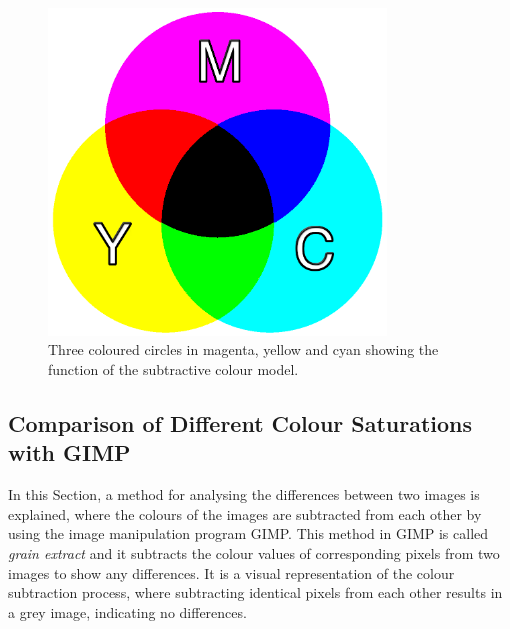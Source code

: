 \documentclass[../MasterThesis.tex]{subfiles}
\begin{document}
\begin{minipage}{0.48\textwidth}
\begin{figure}[H]
	\centering
	
	\includegraphics[width=0.8\textwidth]{YMCA.png}
	
	\caption[Subtractive colour model of RGB]{Three coloured circles in magenta, yellow and cyan showing the function of the subtractive colour model.}
	\label{figure:othercolourwheel}
	
\end{figure}
\end{minipage}

\vspace*{1em}









\subsection{Comparison of Different Colour Saturations with GIMP}
\label{subsection:ComparisonOfDifferentColourSaturations}



In this Section, a method for analysing the differences between two images is explained, where the colours of the images are subtracted from each other by using the image manipulation program GIMP. 
This method in GIMP is called \textit{grain extract} and it subtracts the colour values of corresponding pixels from two images to show any differences. It is a visual representation of the colour subtraction process, where subtracting identical pixels from each other results in a grey image, indicating no differences.~\cite{gimp}
\end{document}
